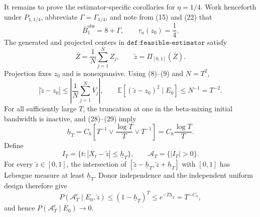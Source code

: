 It remains to prove the estimator-specific corollaries for \(\eta=1/4\).  Work henceforth under \(P_{1,1/4}\), abbreviate \(\Gamma=\Gamma_{1/4}\), and note from (15) and (22) that
\[
\bar B_1^{\mathrm{obs}}=8+\Gamma,
\qquad
\tau_n(z_0)=\frac14.
\tag{36}
\]
The generated and projected centers in \(\texttt{def:feasible-estimator}\) satisfy
\[
\bar Z=\frac1N\sum_{j=1}^{N}Z_j,
\qquad
\widetilde z=\Pi_{[0,1]}(\bar Z).
\tag{37}
\]
Projection fixes \(z_0\) and is nonexpansive.  Using (8)--(9) and \(N=T^2\),
\[
|\widetilde z-z_0|
\le\left|\frac1N\sum_{j=1}^{N}V_j\right|,
\qquad
\mathbb E[(\widetilde z-z_0)^2\mid E_0]
\le N^{-1}=T^{-2}.
\tag{38}
\]
For all sufficiently large \(T\), the truncation at one in the beta-mixing initial bandwidth is inactive, and (28)--(29) imply
\[
\underline h_T
=C_h\left[T^{-1}\vee\frac{\log T}{T}\vee T^{-1}\right]
=C_h\frac{\log T}{T}.
\tag{39}
\]
Define
\[
I_T=\{t:|X_t-\widetilde z|\le\underline h_T\},
\qquad
\mathcal A_T=\{|I_T|>0\}.
\tag{40}
\]
For every \(\widetilde z\in[0,1]\), the intersection of \([\widetilde z-\underline h_T,\widetilde z+\underline h_T]\) with \([0,1]\) has Lebesgue measure at least \(\underline h_T\).  Donor independence and the independent uniform design therefore give
\[
P(\mathcal A_T^c\mid E_0,\widetilde z)
\le(1-\underline h_T)^T
\le e^{-T\underline h_T}
=T^{-C_h},
\tag{41}
\]
and hence \(P(\mathcal A_T^c\mid E_0)\to0\).

